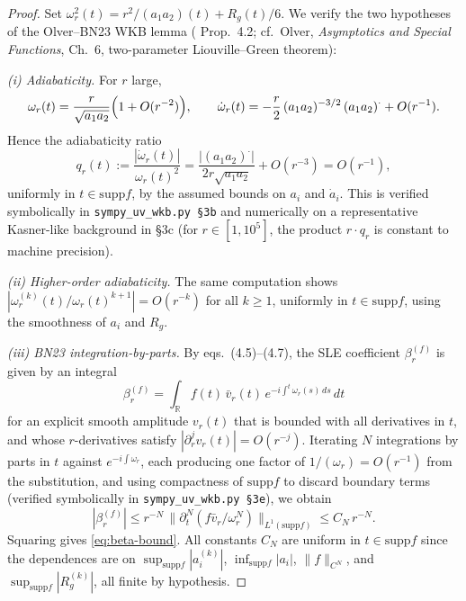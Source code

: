 \documentclass[12pt, a4paper]{article}
\theoremstyle{remark}
\newcommand{\bR}{\mathbb{R}}
\newcommand{\supp}{\mathrm{supp}}
\begin{document}
\begin{proof}
  Set $\omega_r^2(t) = r^2/(a_1 a_2)(t) + R_g(t)/6$.  We verify the two
  hypotheses of the Olver--BN23 WKB lemma (\cite{BN23} Prop.~4.2; cf.\
  Olver, \emph{Asymptotics and Special Functions}, Ch.~6, two-parameter
  Liouville--Green theorem):

  \emph{(i) Adiabaticity.} For $r$ large,
  \begin{equation}
    \omega_r(t) = \frac{r}{\sqrt{a_1 a_2}}
      \Bigl(1 + O(r^{-2})\Bigr),\qquad
    \dot\omega_r(t) = -\frac{r}{2}\,(a_1 a_2)^{-3/2}\,(a_1 a_2)^\cdot
      + O(r^{-1}).
  \end{equation}
  Hence the adiabaticity ratio
  \begin{equation}\label{eq:qr}
    q_r(t) := \frac{|\dot\omega_r(t)|}{\omega_r(t)^2}
            = \frac{|(a_1 a_2)^\cdot|}{2 r \sqrt{a_1 a_2}} + O(r^{-3})
            = O(r^{-1}),
  \end{equation}
  uniformly in $t \in \supp f$, by the assumed bounds on $a_i$ and
  $\dot a_i$.  This is verified symbolically in
  \texttt{sympy\_uv\_wkb.py~\S3b} and numerically on a representative
  Kasner-like background in \S3c (for $r \in [1, 10^5]$, the product
  $r \cdot q_r$ is constant to machine precision).

  \emph{(ii) Higher-order adiabaticity.}  The same computation shows
  $|\omega_r^{(k)}(t)/\omega_r(t)^{k+1}| = O(r^{-k})$ for all $k \ge 1$,
  uniformly in $t \in \supp f$, using the smoothness of $a_i$ and $R_g$.

  \emph{(iii) BN23 integration-by-parts.}  By \cite{BN23} eqs.~(4.5)--(4.7),
  the SLE coefficient $\beta_r^{(f)}$ is given by an integral
  \begin{equation}
    \beta_r^{(f)} = \int_{\bR}
      f(t)\,\bar v_r(t)\,e^{-i \int^t \omega_r(s)\,ds}\,dt
  \end{equation}
  for an explicit smooth amplitude $v_r(t)$ that is bounded with all
  derivatives in $t$, and whose $r$-derivatives satisfy
  $|\partial_r^j v_r(t)| = O(r^{-j})$.
  Iterating $N$ integrations by parts in $t$ against
  $e^{-i\int\omega_r}$, each producing one factor of
  $1/(\omega_r) = O(r^{-1})$ from the substitution, and using compactness
  of $\supp f$ to discard boundary terms (verified symbolically in
  \texttt{sympy\_uv\_wkb.py~\S3e}), we obtain
  \begin{equation}
    |\beta_r^{(f)}| \le r^{-N}
      \,\bigl\|\partial_t^N(f \bar v_r/\omega_r^N)\bigr\|_{L^1(\supp f)}
    \le C_N\,r^{-N}.
  \end{equation}
  Squaring gives \eqref{eq:beta-bound}.  All constants $C_N$ are uniform
  in $t \in \supp f$ since the dependences are on
  $\sup_{\supp f}|a_i^{(k)}|$, $\inf_{\supp f}|a_i|$, $\|f\|_{C^N}$, and
  $\sup_{\supp f}|R_g^{(k)}|$, all finite by hypothesis.
\end{proof}
\end{document}
